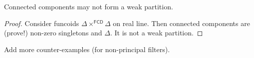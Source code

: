 \begin{example}
  Connected components may not form a weak partition.
\end{example}

\begin{proof}
  Consider funcoids $\Delta \times^{\mathsf{FCD}} \Delta$ on real line.
  Then connected components are (prove!) non-zero singletons and $\Delta$. It
  is not a weak partition.
\end{proof}

Add more counter-examples (for non-principal filters).
